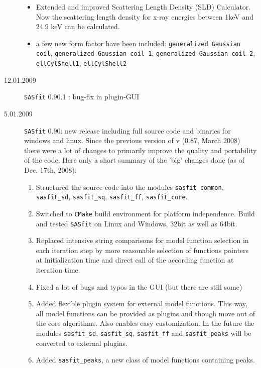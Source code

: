 \begin{description}
\begin{itemize}
            \item Extended and improved Scattering Length Density (SLD) Calculator.
                  Now the scattering length density for x-ray energies between 1keV
                  and 24.9 keV can be calculated.
            \item a few new form factor have been included:
                        \texttt{generalized Gaussian coil},
                        \texttt{generalized Gaussian coil 1},
                        \texttt{generalized Gaussian coil 2},
                        \texttt{ellCylShell1},
                        \texttt{ellCylShell2}
        \end{itemize}
    \item[12.01.2009]{\tt SASfit} 0.90.1 : bug-fix in plugin-GUI
    \item[5.01.2009] {\tt SASfit} 0.90:
    new release including full source code and binaries for
    windows and linux. Since the previous version of v (0.87, March 2008)
    there were a lot of changes to primarily improve the quality
    and portability of the code. Here only a short summary of the 'big'
    changes done (as of Dec. 17th, 2008):
    \begin{enumerate}
        \item Structured the source code into the modules \texttt{sasfit\_common}, \texttt{sasfit\_sd}, \texttt{sasfit\_sq},
                \texttt{sasfit\_ff}, \texttt{sasfit\_core}.
        \item Switched to {\tt CMake} build environment for platform independence. Build and tested {\tt SASfit} on
                Linux and Windows, 32bit as well as 64bit.
        \item Replaced intensive string comparisons for model function selection in each iteration step by more reasonable
                selection of functions pointers at initialization time and direct call of the according function at iteration time.
        \item Fixed a lot of bugs and typos in the GUI (but there are still some)
        \item Added flexible plugin system for external model functions. This way, all model functions can be provided
                as plugins and though move out of the core algorithms. Also enables easy customization. In the future
                the modules \texttt{sasfit\_sd}, \texttt{sasfit\_sq}, \texttt{sasfit\_ff} and \texttt{sasfit\_peaks}
                will be converted to external plugins.
        \item Added \texttt{sasfit\_peaks}, a new class of model functions containing peaks.

\end{enumerate}
\end{description}
